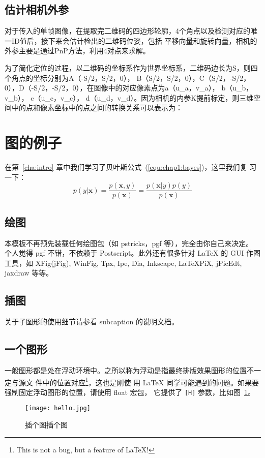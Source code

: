 \subsection{估计相机外参}
\label{sec:2.2.3}
对于传入的单帧图像，在提取完二维码的四边形轮廓，4个角点以及检测对应的唯一ID值后，接下来会估计检出的二维码位姿，包括
平移向量和旋转向量，相机的外参主要是通过PnP方法，利用4对点来求解。

为了简化定位的过程，以二维码的坐标系作为世界坐标系，二维码边长为S，则四个角点的坐标分别为A（-S/2，S/2，0），
B（S/2，S/2，0），C（S/2，-S/2，0），D（-S/2，-S/2，0），在图像中的对应像素点为a（u_a，v_a）， b（u_b，v_b），
 c（u_c，v_c）， d（u_d，v_d）。因为相机的内参K提前标定，则三维空间中的点和像素坐标中的点之间的转换关系可以表示为：


\section{图的例子}
\label{sec:other}

在第~\ref{cha:intro} 章中我们学习了贝叶斯公式~(\ref{equ:chap1:bayes})，这里我们复
习一下：
\begin{equation}
\label{equ:chap2:bayes}
p(y|\mathbf{x}) = \frac{p(\mathbf{x},y)}{p(\mathbf{x})}=
\frac{p(\mathbf{x}|y)p(y)}{p(\mathbf{x})}
\end{equation}

\subsection{绘图}
\label{sec:draw}

本模板不再预先装载任何绘图包（如 \textsf{pstricks，pgf} 等），完全由你自己来决定。
个人觉得 \textsf{pgf} 不错，不依赖于 Postscript。此外还有很多针对 \LaTeX{} 的
 GUI 作图工具，如 XFig(jFig), WinFig, Tpx, Ipe, Dia, Inkscape, LaTeXPiX,
jPicEdt, jaxdraw 等等。

\subsection{插图}
\label{sec:graphs}
关于子图形的使用细节请参看 \textsf{subcaption} 的说明文档。

\subsection{一个图形}
\label{sec:onefig}
一般图形都是处在浮动环境中。之所以称为浮动是指最终排版效果图形的位置不一定与源文
件中的位置对应\footnote{This is not a bug, but a feature of
\LaTeX!}，这也是刚使 用 \LaTeX{}
同学可能遇到的问题。如果要强制固定浮动图形的位置，请使用
\textsf{float} 宏包， 它提供了 \texttt{[H]}
参数，比如图~\ref{fig:heythere}。
\begin{figure}[H] %
  \centering
  \texttt{[image: hello.jpg]}
  \caption{插个图插个图}
  \label{fig:heythere}
\end{figure}

